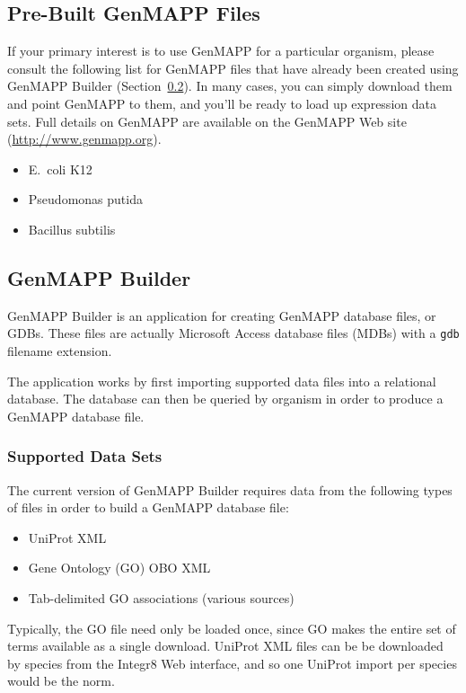 \documentclass[11pt]{article}
\begin{document}
\subsection{Pre-Built GenMAPP Files}

If your primary interest is to use GenMAPP for a particular organism, please consult the following list for GenMAPP files that have already been created using GenMAPP Builder (Section~\ref{genmappBuilder}).  In many cases, you can simply download them and point GenMAPP to them, and you'll be ready to load up expression data sets.  Full details on GenMAPP are available on the GenMAPP Web site (\url{http://www.genmapp.org}).

\begin{itemize}
\item E.\ coli K12
\item Pseudomonas putida
\item Bacillus subtilis
\end{itemize}

\subsection{GenMAPP Builder}
\label{genmappBuilder}

GenMAPP Builder is an application for creating GenMAPP database files, or GDBs.  These files are actually Microsoft Access database files (MDBs) with a \texttt{gdb} filename extension.

The application works by first importing supported data files into a relational database.  The database can then be queried by organism in order to produce a GenMAPP database file.

\subsubsection{Supported Data Sets}
\label{supportedDataSets}

The current version of GenMAPP Builder requires data from the following types of files in order to build a GenMAPP database file:
\begin{itemize}
\item UniProt XML
\item Gene Ontology (GO) OBO XML
\item Tab-delimited GO associations (various sources)
\end{itemize}
Typically, the GO file need only be loaded once, since GO makes the entire set of terms available as a single download.  UniProt XML files can be be downloaded by species from the Integr8 Web interface, and so one UniProt import per species would be the norm.
\end{document}
